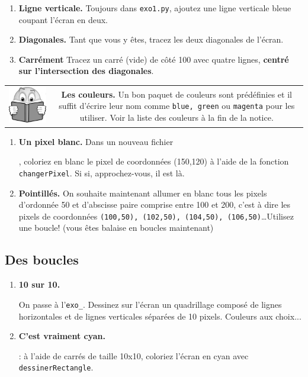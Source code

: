 \documentclass[11pt,a4paper]{article}
\newcommand{\checkbox}{$\square$ \smallskip}
\newenvironment{lecture}{%
\smallskip
\begin{tabular}{c|c}
    \hspace{.03\textwidth} \includegraphics[width=.07\textwidth]{img/lecture.jpg} & 
\begin{minipage}{.85\textwidth}
}{%
\end{minipage}
\end{tabular}
}
\newcounter{exo} \setcounter{exo}{0}
\newenvironment{action}{%
    \begin{enumerate}[\numerotation] \addtocounter{exo}{-1}%
        }{%
    \end{enumerate}
}
\newcommand{\numexoa}{\theexo \addtocounter{exo}{1}}
\newcommand{\numerotation}{\checkbox \smallskip \numexoa.}
\newcounter{exoo} \setcounter{exoo}{0}
\newcommand{\numexo}{\theexoo}
\newcommand{\repexo}{{\tt exo_\numexo}}
\newcommand{\exoplus}{\addtocounter{exoo}{1}}
\begin{document}
\begin{action}
\item {\bf Ligne verticale.} Toujours dans {\tt exo1.py}, ajoutez une ligne verticale bleue coupant l'écran en deux.
\item {\bf Diagonales.} Tant que vous y êtes, tracez les deux diagonales de l'écran.
\item {\bf Carrément} Tracez un carré (vide) de côté 100 avec quatre lignes, {\bf centré sur l'intersection des diagonales}.
\end{action}

\begin{lecture}
    {\bf Les couleurs.} Un bon paquet de couleurs sont prédéfinies et il suffit d'écrire leur nom comme {\tt blue, green} ou {\tt magenta} pour les utiliser. Voir la liste des couleurs à la fin de la notice.
\end{lecture}

\begin{action}
\item {\bf Un pixel blanc.} Dans un nouveau fichier \exoplus \repexo, coloriez en blanc le pixel de coordonnées (150,120) à l'aide de la fonction {\tt changerPixel}. Si si, approchez-vous, il est là.
\item {\bf Pointillés.} On souhaite maintenant allumer en blanc tous les pixels d'ordonnée 50 et d'abscisse paire comprise entre 100 et 200, c'est à dire les pixels de coordonnées {\tt (100,50), (102,50), (104,50), (106,50)}\dots Utilisez une boucle! (vous êtes balaise en boucles maintenant)
\end{action}

\subsection*{Des boucles}
\begin{action}
\item {\bf 10 sur 10.} \exoplus On passe à l'\repexo. 
Dessinez sur l'écran un quadrillage composé de lignes horizontales et de lignes verticales séparées de 10 pixels. Couleurs aux choix...
\item {\bf C'est vraiment cyan.} \exoplus \repexo : à l'aide de carrés de taille 10x10, coloriez l'écran en cyan avec {\tt dessinerRectangle}. 
\end{action}
\end{document}
